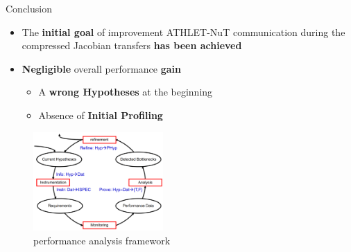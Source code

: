 \begin{frame}[t]{Conclusion}
    \small
    \justifying
    
    \begin{itemize}
            \item The \textbf{initial goal} of improvement ATHLET-NuT communication during the compressed Jacobian transfers \textbf{has been achieved}
            \item \textbf{Negligible} overall performance \textbf{gain}
            \begin{itemize}
                \item A \textbf{wrong Hypotheses} at the beginning
                \item Absence of \textbf{Initial Profiling}
            \end{itemize}
    \end{itemize}
    
        \begin{figure}[htpb]
        \centering
        \includegraphics[width=0.44\textwidth]{figures/chapter-3/Performance-analysis.png}
        \caption{performance analysis framework \cite{perfomance-analysis-framework}}
    \end{figure}

\end{frame}
